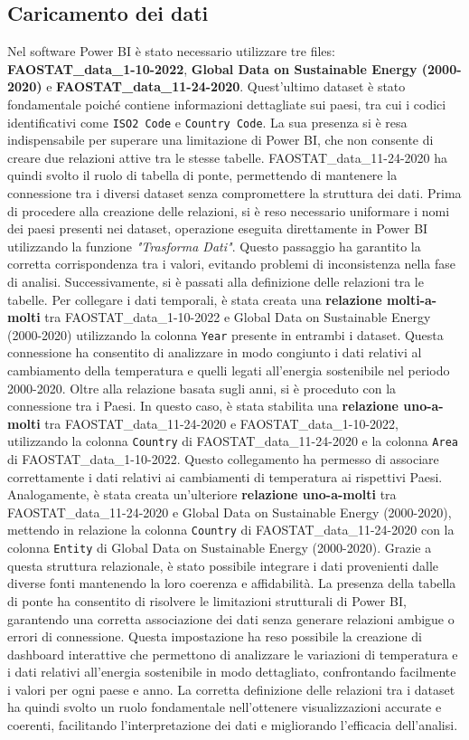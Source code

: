 \subsection{Caricamento dei dati}
Nel software Power BI è stato necessario utilizzare tre files: \textbf{FAOSTAT\_data\_1-10-2022}, \textbf{Global Data on Sustainable Energy (2000-2020)} e \textbf{FAOSTAT\_data\_11-24-2020}. Quest’ultimo dataset è stato fondamentale poiché contiene informazioni dettagliate sui paesi, tra cui i codici identificativi come \texttt{ISO2 Code} e \texttt{Country Code}. La sua presenza si è resa indispensabile per superare una limitazione di Power BI, che non consente di creare due relazioni attive tra le stesse tabelle. FAOSTAT\_data\_11-24-2020 ha quindi svolto il ruolo di tabella di ponte, permettendo di mantenere la connessione tra i diversi dataset senza compromettere la struttura dei dati.  
Prima di procedere alla creazione delle relazioni, si è reso necessario uniformare i nomi dei paesi presenti nei dataset, operazione eseguita direttamente in Power BI utilizzando la funzione \textit{"Trasforma Dati"}. Questo passaggio ha garantito la corretta corrispondenza tra i valori, evitando problemi di inconsistenza nella fase di analisi. Successivamente, si è passati alla definizione delle relazioni tra le tabelle. Per collegare i dati temporali, è stata creata una \textbf{relazione molti-a-molti} tra FAOSTAT\_data\_1-10-2022 e Global Data on Sustainable Energy (2000-2020) utilizzando la colonna \texttt{Year} presente in entrambi i dataset. Questa connessione ha consentito di analizzare in modo congiunto i dati relativi al cambiamento della temperatura e quelli legati all'energia sostenibile nel periodo 2000-2020.  
Oltre alla relazione basata sugli anni, si è proceduto con la connessione tra i Paesi. In questo caso, è stata stabilita una \textbf{relazione uno-a-molti} tra FAOSTAT\_data\_11-24-2020 e FAOSTAT\_data\_1-10-2022, utilizzando la colonna \texttt{Country} di FAOSTAT\_data\_11-24-2020 e la colonna \texttt{Area} di FAOSTAT\_data\_1-10-2022. Questo collegamento ha permesso di associare correttamente i dati relativi ai cambiamenti di temperatura ai rispettivi Paesi. Analogamente, è stata creata un'ulteriore \textbf{relazione uno-a-molti} tra FAOSTAT\_data\_11-24-2020 e Global Data on Sustainable Energy (2000-2020), mettendo in relazione la colonna \texttt{Country} di FAOSTAT\_data\_11-24-2020 con la colonna \texttt{Entity} di Global Data on Sustainable Energy (2000-2020).  
Grazie a questa struttura relazionale, è stato possibile integrare i dati provenienti dalle diverse fonti mantenendo la loro coerenza e affidabilità. La presenza della tabella di ponte ha consentito di risolvere le limitazioni strutturali di Power BI, garantendo una corretta associazione dei dati senza generare relazioni ambigue o errori di connessione. Questa impostazione ha reso possibile la creazione di dashboard interattive che permettono di analizzare le variazioni di temperatura e i dati relativi all'energia sostenibile in modo dettagliato, confrontando facilmente i valori per ogni paese e anno. La corretta definizione delle relazioni tra i dataset ha quindi svolto un ruolo fondamentale nell’ottenere visualizzazioni accurate e coerenti, facilitando l’interpretazione dei dati e migliorando l’efficacia dell’analisi.
